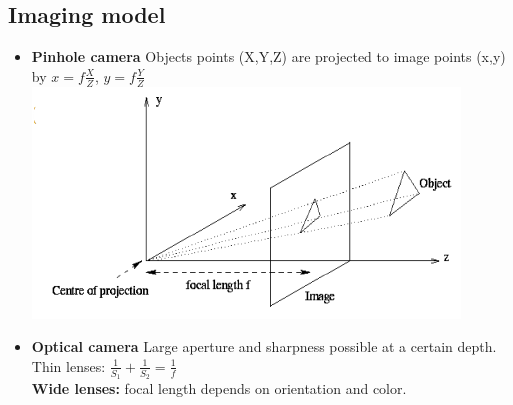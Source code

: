 \documentclass{article}
\begin{document}
\subsection{Imaging model}
\begin{itemize}
\item \textbf{Pinhole camera}
Objects points (X,Y,Z) are projected to image points (x,y) by $x=f \frac{X}{Z}$, $y=f \frac{Y}{Z}$\\
\includegraphics[scale=0.7]{12.png}
\item \textbf{Optical camera}
Large aperture and sharpness possible at a certain depth. Thin lenses: $\frac{1}{S_1}+\frac{1}{S_2}=\frac{1}{f}$\\
\textbf{Wide lenses:} focal length depends on orientation and color.
\end{itemize}
\end{document}
